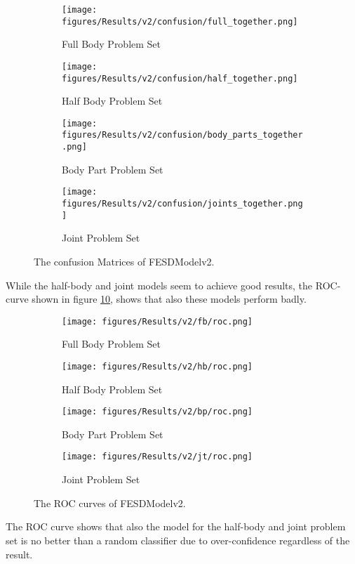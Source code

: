 \begin{figure}
  \centering
  \begin{subfigure}[b]{0.47\linewidth}
      \centering
      \texttt{[image: figures/Results/v2/confusion/full\_together.png]}
      \caption[]{Full Body Problem Set}
      \label{fig:fb_conf}
  \end{subfigure}
  \hfill
  \begin{subfigure}[b]{0.47\linewidth}
      \centering
      \texttt{[image: figures/Results/v2/confusion/half\_together.png]}
      \caption{Half Body Problem Set}
      \label{fig:hb_conf}
  \end{subfigure}
  \hfill
  \begin{subfigure}[b]{0.47\linewidth}
      \centering
      \texttt{[image: figures/Results/v2/confusion/body\_parts\_together.png]}
      \caption{Body Part Problem Set}
      \label{fig:bp_conf}
  \end{subfigure}
  \hfill
  \begin{subfigure}[b]{0.47\linewidth}
      \centering
      \texttt{[image: figures/Results/v2/confusion/joints\_together.png]}
      \caption{Joint Problem Set}
      \label{fig:jt_conf}
  \end{subfigure}
  \caption[Confusion Matrices of FESDModelv2]{The confusion Matrices of FESDModelv2.}
  \label{fig:conf_v2}
\end{figure}

While the half-body and joint models seem to achieve good results, the ROC-curve shown in figure \ref{fig:roc_v2}, shows that also these models perform badly.

\begin{figure}
  \centering
  \begin{subfigure}[b]{0.47\linewidth}
      \centering
      \texttt{[image: figures/Results/v2/fb/roc.png]}
      \caption[]{Full Body Problem Set}
      \label{fig:fb_roc_v2}
  \end{subfigure}
  \hfill
  \begin{subfigure}[b]{0.47\linewidth}
      \centering
      \texttt{[image: figures/Results/v2/hb/roc.png]}
      \caption[]{Half Body Problem Set}
      \label{fig:hb_roc_v2}
  \end{subfigure}
  \hfill
  \begin{subfigure}[b]{0.47\linewidth}
      \centering
      \texttt{[image: figures/Results/v2/bp/roc.png]}
      \caption[]{Body Part Problem Set}
      \label{fig:bp_roc_v2}
  \end{subfigure}
  \hfill
  \begin{subfigure}[b]{0.47\linewidth}
      \centering
      \texttt{[image: figures/Results/v2/jt/roc.png]}
      \caption[]{Joint Problem Set}
      \label{fig:jt_roc_v2}
  \end{subfigure}
  \caption[ROC Curves of FESDModelv2]{The ROC curves of FESDModelv2.}
  \label{fig:roc_v2}
\end{figure}

The ROC curve shows that also the model for the half-body and joint problem set is no better than a random classifier due to over-confidence regardless of the result.